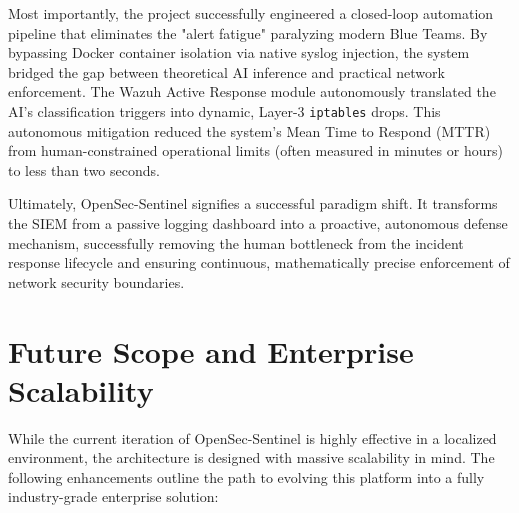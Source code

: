 \documentclass[12pt, a4paper]{report}
\begin{document}
	
	
	Most importantly, the project successfully engineered a closed-loop automation pipeline that eliminates the "alert fatigue" paralyzing modern Blue Teams. By bypassing Docker container isolation via native syslog injection, the system bridged the gap between theoretical AI inference and practical network enforcement. The Wazuh Active Response module autonomously translated the AI’s classification triggers into dynamic, Layer-3 \texttt{iptables} drops. This autonomous mitigation reduced the system's Mean Time to Respond (MTTR) from human-constrained operational limits (often measured in minutes or hours) to less than two seconds. 
	
	Ultimately, OpenSec-Sentinel signifies a successful paradigm shift. It transforms the SIEM from a passive logging dashboard into a proactive, autonomous defense mechanism, successfully removing the human bottleneck from the incident response lifecycle and ensuring continuous, mathematically precise enforcement of network security boundaries.
	
	\section{Future Scope and Enterprise Scalability}
	While the current iteration of OpenSec-Sentinel is highly effective in a localized environment, the architecture is designed with massive scalability in mind. The following enhancements outline the path to evolving this platform into a fully industry-grade enterprise solution:
	
\end{document}
